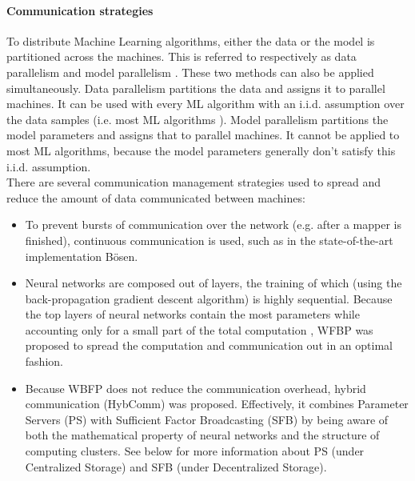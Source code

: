 \paragraph{Communication strategies}
To distribute Machine Learning algorithms, either the data or the model is partitioned across the machines. This is referred to respectively as data parallelism and model parallelism \cite{Die12}. These two methods can also be applied simultaneously\cite{Xing16}. Data parallelism partitions the data and assigns it to parallel machines. It can be used with every ML algorithm with an i.i.d. assumption over the data samples (i.e. most ML algorithms \cite{Xing16}). Model parallelism partitions the model parameters and assigns that to parallel machines. It cannot be applied to most ML algorithms, because the model parameters generally don't satisfy this i.i.d. assumption.\\
There are several communication management strategies\cite{Xing16} used to spread and reduce the amount of data communicated between machines:
\begin{itemize}
	\item To prevent bursts of communication over the network (e.g. after a mapper is finished), continuous communication is used, such as in the state-of-the-art implementation Bösen\cite{Wei15}.
	
	\item Neural networks are composed out of layers, the training of which (using the back-propagation gradient descent algorithm) is highly sequential. Because the top layers of neural networks contain the most parameters while accounting only for a small part of the total computation \cite{Xing16}, WFBP \cite{Zhang17} was proposed to spread the computation and communication out in an optimal fashion.
	
	\item Because WBFP does not reduce the communication overhead, hybrid communication (HybComm) \cite{Zhang17} was proposed. Effectively, it combines Parameter Servers (PS)\cite{Wei15} with Sufficient Factor Broadcasting (SFB)\cite{Xie15} by being aware of both the mathematical property of neural networks and the structure of computing clusters. See below for more information about PS (under Centralized Storage) and SFB (under Decentralized Storage).
	
\end{itemize}


